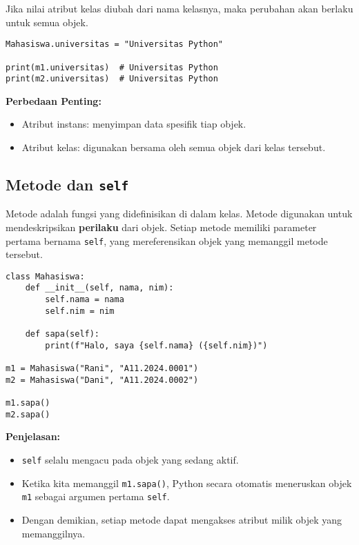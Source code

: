 Jika nilai atribut kelas diubah dari nama kelasnya, maka perubahan akan berlaku untuk semua objek.

\begin{lstlisting}[style=PythonStyle, caption={Perubahan Atribut Kelas}]
Mahasiswa.universitas = "Universitas Python"

print(m1.universitas)  # Universitas Python
print(m2.universitas)  # Universitas Python
\end{lstlisting}

\noindent\textbf{Perbedaan Penting:}
\begin{itemize}
    \item Atribut instans: menyimpan data spesifik tiap objek.
    \item Atribut kelas: digunakan bersama oleh semua objek dari kelas tersebut.
\end{itemize}

\subsection{Metode dan \texttt{self}}

Metode adalah fungsi yang didefinisikan di dalam kelas. Metode digunakan untuk mendeskripsikan \textbf{perilaku} dari objek.  
Setiap metode memiliki parameter pertama bernama \texttt{self}, yang mereferensikan objek yang memanggil metode tersebut.

\begin{lstlisting}[style=PythonStyle, caption={Metode dengan self}]
class Mahasiswa:
    def __init__(self, nama, nim):
        self.nama = nama
        self.nim = nim

    def sapa(self):
        print(f"Halo, saya {self.nama} ({self.nim})")

m1 = Mahasiswa("Rani", "A11.2024.0001")
m2 = Mahasiswa("Dani", "A11.2024.0002")

m1.sapa()
m2.sapa()
\end{lstlisting}

\noindent\textbf{Penjelasan:}
\begin{itemize}
    \item \texttt{self} selalu mengacu pada objek yang sedang aktif.
    \item Ketika kita memanggil \texttt{m1.sapa()}, Python secara otomatis meneruskan objek \texttt{m1} sebagai argumen pertama \texttt{self}.
    \item Dengan demikian, setiap metode dapat mengakses atribut milik objek yang memanggilnya.
\end{itemize}

